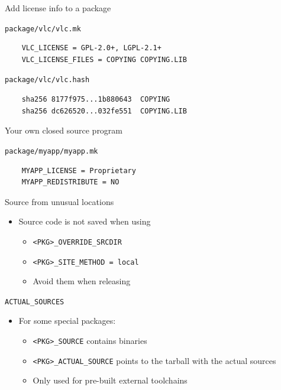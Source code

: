\documentclass[xetex,table,table]{beamer}
\begin{document}
\begin{frame}[fragile]{Add license info to a package}

  {\tt package/vlc/vlc.mk}
  \begin{verbatim}
    VLC_LICENSE = GPL-2.0+, LGPL-2.1+
    VLC_LICENSE_FILES = COPYING COPYING.LIB
  \end{verbatim}

  {\tt package/vlc/vlc.hash}
  \begin{verbatim}
    sha256 8177f975...1b880643  COPYING
    sha256 dc626520...032fe551  COPYING.LIB
  \end{verbatim}
\end{frame}

\begin{frame}[fragile]{Your own closed source program}

  {\tt package/myapp/myapp.mk}
  \begin{verbatim}
    MYAPP_LICENSE = Proprietary
    MYAPP_REDISTRIBUTE = NO
  \end{verbatim}
\end{frame}

\begin{frame}{Source from unusual locations}
  \begin{itemize}
  \item Source code is not saved when using
    \begin{itemize}
    \item {\tt <PKG>\_OVERRIDE\_SRCDIR}
    \item {\tt <PKG>\_SITE\_METHOD = local}
    \item[\textrightarrow] Avoid them when releasing
    \end{itemize}
  \end{itemize}
\end{frame}

\begin{frame}{\tt ACTUAL\_SOURCES}
  \begin{itemize}
  \item For some special packages:
    \begin{itemize}
    \item {\tt <PKG>\_SOURCE} contains binaries
    \item {\tt <PKG>\_ACTUAL\_SOURCE} points to the tarball with the actual sources
    \item Only used for pre-built external toolchains
    \end{itemize}
  \end{itemize}
\end{frame}
\end{document}
